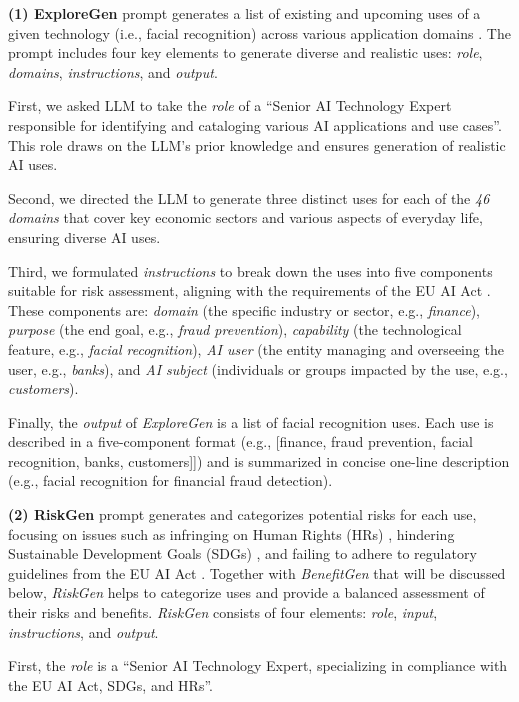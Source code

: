 \smallskip
\textbf{(1) ExploreGen} prompt generates a list of existing and upcoming uses of a given technology (i.e., facial recognition) across various application domains \cite{herdel2024exploregen}. The prompt includes four key elements to generate diverse and realistic uses: \emph{role}, \emph{domains}, \emph{instructions}, and \emph{output}. 

First, we asked LLM to take the \emph{role} of a ``Senior AI Technology Expert responsible for identifying and cataloging various AI applications and use cases''. This role draws on the LLM's prior knowledge and ensures generation of realistic AI uses. 

Second, we directed the LLM to generate three distinct uses for each of the \emph{46 domains} that cover key economic sectors and various aspects of everyday life, ensuring diverse AI uses.

Third, we formulated \emph{instructions} to break down the uses into five components suitable for risk assessment, aligning with the requirements of the EU AI Act \cite{Golpayegani2023Risk}. These components are: \textit{domain} (the specific industry or sector, e.g., \emph{finance}), \textit{purpose} (the end goal, e.g., \emph{fraud prevention}), \textit{capability} (the technological feature, e.g., \emph{facial recognition}), \textit{AI user} (the entity managing and overseeing the user, e.g., \emph{banks}), and \textit{AI subject} (individuals or groups impacted by the use, e.g., \emph{customers}).

Finally, the \emph{output} of \emph{ExploreGen} is a list of facial recognition uses. Each use is described in a five-component format (e.g., [finance, fraud prevention, facial recognition, banks, customers]]) and is summarized in concise one-line description (e.g., facial recognition for financial fraud detection).

\smallskip
\noindent\textbf{(2) RiskGen} prompt generates and categorizes potential risks for each use, focusing on issues such as infringing on Human Rights (HRs) \cite{rights1961universal}, hindering Sustainable Development Goals (SDGs) \cite{sdgs}, and failing to adhere to regulatory guidelines from the EU AI Act \cite{EUACT2024}. Together with \emph{BenefitGen} that will be discussed below, \emph{RiskGen} helps to categorize uses and provide a balanced assessment of their risks and benefits. \emph{RiskGen} consists of four elements: \emph{role}, \emph{input}, \emph{instructions}, and \emph{output}. 

First, the \emph{role} is a ``Senior AI Technology Expert, specializing in compliance with the EU AI Act, SDGs, and HRs''.

